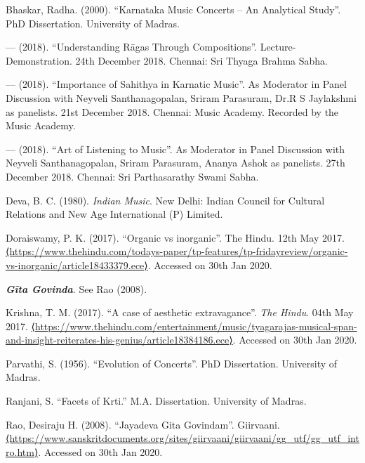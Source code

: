 \begin{thebibliography}{99}
\itemsep=0pt

  Bhaskar, Radha. (2000). “Karnataka Music Concerts – An Analytical Study”. PhD Dissertation. University of Madras.

  — (2018). “Understanding Rāgas Through Compositions”. Lecture-Demonstration. 24th December 2018. Chennai: Sri Thyaga Brahma Sabha.

  — (2018). “Importance of Sahithya in Karnatic Music”. As Moderator in Panel Discussion with Neyveli Santhanagopalan, Sriram Parasuram, Dr.R S Jaylakshmi as panelists. 21st December 2018. Chennai: Music Academy. Recorded by the Music Academy.

  — (2018). “Art of Listening to Music”. As Moderator in Panel Discussion with Neyveli Santhanagopalan, Sriram Parasuram, Ananya Ashok as panelists. 27th December 2018. Chennai: Sri Parthasarathy Swami Sabha.

  Deva, B. C. (1980). \textit{Indian Music}. New Delhi: Indian Council for Cultural Relations and New Age International (P) Limited.

  Doraiswamy, P. K. (2017). “Organic vs inorganic”. The Hindu. 12th May 2017. \url{⟨https://www.thehindu.com/todays-paper/tp-features/tp-fridayreview/organic-vs-inorganic/article18433379.ece⟩}. Accessed on 30th Jan 2020.

  \textbf{\textit{Gīta Govinda}}. See Rao (2008).

  Krishna, T. M. (2017). “A case of aesthetic extravagance”. \textit{The Hindu}. 04th May 2017. \url{⟨https://www.thehindu.com/entertainment/music/tyagarajas-musical-span-and-insight-reiterates-his-genius/article18384186.ece⟩}. Accessed on 30th Jan 2020.

  Parvathi, S. (1956). “Evolution of Concerts”. PhD Dissertation. University of Madras.

  Ranjani, S. “Facets of Krti.” M.A. Dissertation. University of Madras.

  Rao, Desiraju H. (2008). “Jayadeva Gita Govindam”. Giirvaani. \url{⟨https://www.sanskritdocuments.org/sites/giirvaani/giirvaani/gg_utf/gg_utf_intro.htm⟩}. Accessed on 30th Jan 2020.


\end{thebibliography}
